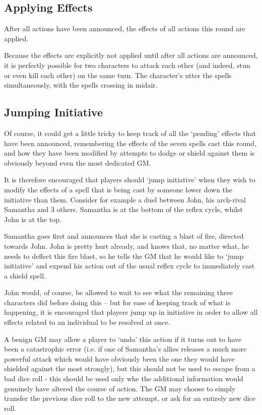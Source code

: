 \subsection{Applying Effects}

After all actions have been announced, the effects of all actions this round are applied. 

Because the effects are explicitly not applied until after all actions are announced, it is perfectly possible for two characters to attack each other (and indeed, stun or even kill each other) on the same turn. The character's utter the spells simultaneously, with the spells crossing in midair.

\subsection{Jumping Initiative}

Of course, it could get a little tricky to keep track of all the `pending' effects that have been announced, remembering the effects of the seven spells cast this round, and how they have been modified by attempts to dodge or shield against them is obviously beyond even the most dedicated GM. 

It is therefore encouraged that players should `jump initiative' when they wish to modify the effects of a spell that is being cast by someone lower down the initiative than them. Consider for example a duel between John, his arch-rival Samantha and 3 others. Samantha is at the bottom of the reflex cycle, whilst John is at the top. 

Samantha goes first and announces that she is casting a \levelThree{} blast of fire, directed towards John. John is pretty hurt already, and knows that, no matter what, he needs to deflect this fire blast, so he tells the GM that he would like to `jump initiative' and expend his action out of the usual reflex cycle to immediately cast a \levelTwo{} shield spell. 

John would, of course, be allowed to wait to see what the remaining three characters did before doing this -- but for ease of keeping track of what is happening, it is encouraged that players jump up in initiative in order to allow all effects related to an individual to be resolved at once. 

A benign GM may allow a player to `undo' this action if it turns out to have been a catastrophic error (i.e. if one of Samantha's allies releases a much more powerful attack which would have obviously been the one they would have shielded against the most strongly), but this should not be used to escape from a bad dice roll - this should be used only whe the additional information would genuinely have altered the course of action. The GM may choose to simply transfer the previous dice roll to the new attempt, or ask for an entirely new dice roll. 




